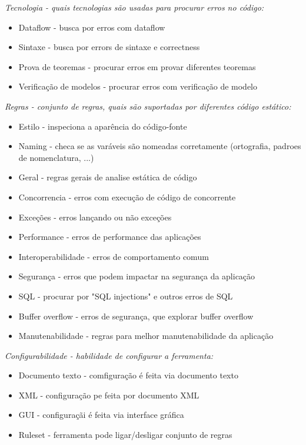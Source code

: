 \begin{description}
  \item {\it Tecnologia - quais tecnologias são usadas para procurar erros no código:}
    \begin{itemize}
      \item Dataflow - busca por erros com dataflow
      \item Sintaxe - busca por errors de sintaxe e correctness
      \item Prova de teoremas - procurar erros em provar diferentes teoremas
      \item Verificação de modelos - procurar erros com verificação de modelo
    \end{itemize}

  \item {\it Regras - conjunto de regras, quais são suportadas por diferentes código estático:}
    \begin{itemize}
      \item Estilo - inspeciona a aparência do código-fonte
      \item Naming - checa se as varáveis são nomeadas corretamente (ortografia, padroes de nomenclatura, ...)
      \item Geral - regras gerais de analise estática de código
      \item Concorrencia - erros com execução de código de concorrente
      \item Exceções - erros lançando ou não exceções
      \item Performance - erros de performance das aplicações
      \item Interoperabilidade - erros de comportamento comum
      \item Segurança - erros que podem impactar na segurança da aplicação
      \item SQL - procurar por "SQL injections" e outros erros de SQL
      \item Buffer overflow - erros de segurança, que explorar buffer overflow
      \item Manutenabilidade - regras para melhor manutenabilidade da aplicação
    \end{itemize}

  \item {\it Configurabilidade - habilidade de configurar a ferramenta:}
    \begin{itemize}
      \item Documento texto - comfiguração é feita via documento texto
      \item XML - configuração pe feita por documento XML
      \item GUI - configuraçãi é feita via interface gráfica
      \item Ruleset - ferramenta pode ligar/desligar conjunto de regras
    \end{itemize}


\end{description}

